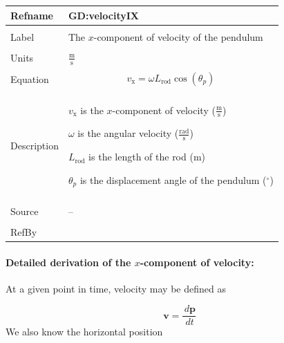 \documentclass[12pt]{article}
\begin{document}
\vspace{\baselineskip}
\noindent
\begin{minipage}{\textwidth}
\begin{tabular}{>{\raggedright}p{}>{\raggedright\arraybackslash}p{}}
\toprule \textbf{Refname} & \textbf{GD:velocityIX}
\label{GD:velocityIX}
\\ \midrule \\
Label & The $x$-component of velocity of the pendulum
        
\\ \midrule \\
Units & $\frac{\text{m}}{\text{s}}$
        
\\ \midrule \\
Equation & \begin{displaymath}
           {v_{\text{x}}}=ω {L_{\text{rod}}} \cos\left({θ_{p}}\right)
           \end{displaymath}
\\ \midrule \\
Description & \begin{symbDescription}
              \item{${v_{\text{x}}}$ is the $x$-component of velocity ($\frac{\text{m}}{\text{s}}$)}
              \item{$ω$ is the angular velocity ($\frac{\text{rad}}{\text{s}}$)}
              \item{${L_{\text{rod}}}$ is the length of the rod (${\text{m}}$)}
              \item{${θ_{p}}$ is the displacement angle of the pendulum (${{}^{\circ}}$)}
              \end{symbDescription}
\\ \midrule \\
Source & --
         
\\ \midrule \\
RefBy & 
\\ \bottomrule
\end{tabular}
\end{minipage}
\paragraph{Detailed derivation of the $x$-component of velocity:}
\label{GD:velocityIXDeriv}
At a given point in time, velocity may be defined as

\begin{displaymath}
\symbf{v}=\frac{\,d\symbf{p}}{\,dt}
\end{displaymath}
We also know the horizontal position
\end{document}
